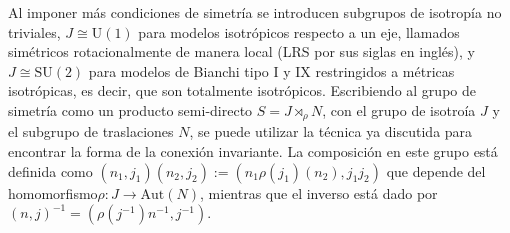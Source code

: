 Al imponer m\'{a}s condiciones de simetr\'{i}a se introducen subgrupos de isotrop\'{i}a no triviales, $J \cong \mathrm{U}(1)$ para modelos isotr\'{o}picos respecto a un eje, llamados sim\'{e}tricos rotacionalmente de manera local (LRS por sus siglas en ingl\'{e}s), y $J \cong \mathrm{SU}(2)$ para modelos de Bianchi tipo I y IX restringidos a m\'{e}tricas isotr\'{o}picas, es decir, que son totalmente isotr\'{o}picos. Escribiendo al grupo de simetr\'{i}a como un producto semi-directo $S = J \rtimes_{\rho} N$, con el grupo de isotro\'{i}a $J$ y el subgrupo de traslaciones $N$, se puede utilizar la t\'{e}cnica ya discutida para encontrar la forma de la conexi\'{o}n invariante. La composici\'{o}n en este grupo est\'{a} definida como $(n_{1}, j_{1})(n_{2}, j_{2}) := (n_{1} \rho(j_{1}) (n_{2}), j_{1} j_{2} )$ que depende del homomorfismo\footnotemark $\rho: J \longrightarrow \mathrm{Aut}(N)$, mientras que el inverso est\'{a} dado por $(n, j)^{-1} = (\rho(j^{-1}) n^{-1}, j^{-1})$.

